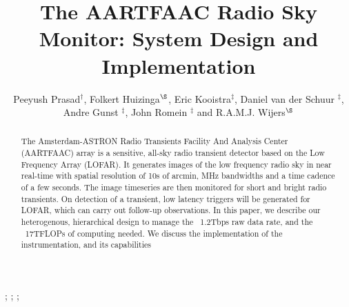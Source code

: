\documentclass{ws-jai}
\begin{document}
\catchline{}{}{}{}{} %


\title{The AARTFAAC Radio Sky Monitor: System Design and Implementation}

\author{Peeyush Prasad$^\dagger$, Folkert Huizinga$^\S$, Eric Kooistra$^\ddagger$, Daniel van der Schuur $^\ddagger$, Andre Gunst $^\ddagger$, John Romein $^\ddagger$ and R.A.M.J. Wijers$^\S$}

\address{
$^\dagger$Anton Pannekoek Institute, University of Amsterdam, Amsterdam, The Netherlands, p.prasad@uva.nl\\
$^\ddagger$ASTRON, Oude Hoogeveensedijk, 7991PD, The Netherlands\\
$^\S$Anton Pannekoek Institute, University of Amsterdam, Amsterdam\\
}

\maketitle


\begin{history}
;
;
;
\end{history}

\begin{abstract}
The Amsterdam-ASTRON  Radio Transients  Facility And Analysis  Center (AARTFAAC)
array  is  a sensitive,  all-sky  radio  transient  detector  based on  the  Low
Frequency Array (LOFAR).  It generates images  of the low frequency radio sky in
near real-time  with spatial resolution of  10s of arcmin, MHz  bandwidths and a
time cadence of a few seconds. The image timeseries are then monitored for short
and bright radio  transients. On detection of a transient,  low latency triggers
will be  generated for LOFAR,  which can  carry out follow-up  observations.  In
this  paper, we  describe our  heterogenous, hierarchical  design to  manage the
~1.2Tbps raw  data rate, and the  ~17TFLOPs of computing needed.  We discuss the
implementation of the instrumentation, and its capabilities
\end{abstract}

\end{document}
